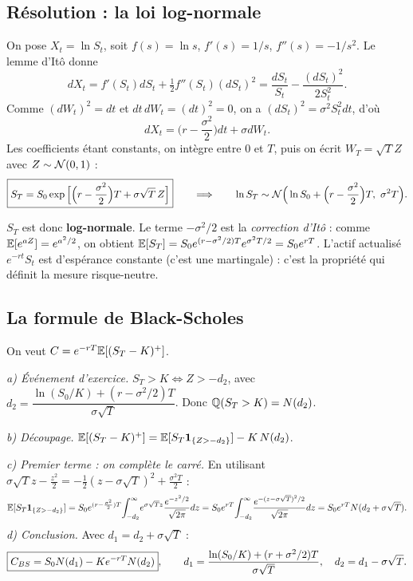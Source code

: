 \subsection{Résolution : la loi log-normale}
\begin{demo}
On pose $X_t = \ln S_t$, soit $f(s)=\ln s$, $f'(s) = 1/s$, $f''(s) = -1/s^2$. Le lemme d'Itô donne
\[
dX_t = f'(S_t)dS_t + \tfrac12f''(S_t)(dS_t)^2 = \frac{dS_t}{S_t} - \frac{(dS_t)^2}{2S_t^2}.
\]
Comme $(dW_t)^2 = dt$ et $dt\,dW_t = (dt)^2 = 0$, on a $(dS_t)^2 = \sigma^2S_t^2dt$, d'où
\[
dX_t = \Big(r-\frac{\sigma^2}{2}\Big)dt + \sigma dW_t.
\]
Les coefficients étant constants, on intègre entre $0$ et $T$, puis on écrit $W_T = \sqrt T Z$ avec $Z\sim\mathcal{N}(0,1)$ :
\[
\boxed{S_T = S_0\exp\Big[\Big(r-\frac{\sigma^2}2\Big)T + \sigma\sqrt T\,Z\Big]}
\qquad\Longrightarrow\qquad \ln S_T\sim\mathcal{N}\Big(\ln S_0+\Big(r-\frac{\sigma^2}2\Big)T,\ \sigma^2T\Big).
\]
\end{demo}

$S_T$ est donc \textbf{log-normale}. Le terme $-\sigma^2/2$ est la \emph{correction d'Itô} : comme $\mathbb{E}[e^{aZ}] = e^{a^2/2}$, on obtient
$\mathbb{E}[S_T] = S_0e^{(r-\sigma^2/2)T}e^{\sigma^2T/2} = S_0e^{rT}$. L'actif actualisé $e^{-rt}S_t$ est d'espérance constante (c'est une martingale) : c'est la propriété qui définit la mesure risque-neutre.

\subsection{La formule de Black-Scholes}
\begin{demo}
On veut $C = e^{-rT}\mathbb{E}[(S_T-K)^+]$.

\emph{a) Événement d'exercice.} $S_T>K \iff Z>-d_2$, avec $d_2 = \dfrac{\ln(S_0/K)+(r-\sigma^2/2)T}{\sigma\sqrt T}$. Donc $\mathbb{Q}(S_T>K) = N(d_2)$.

\emph{b) Découpage.} $\mathbb{E}[(S_T-K)^+] = \mathbb{E}[S_T\mathbf{1}_{\{Z>-d_2\}}] - K\,N(d_2)$.

\emph{c) Premier terme : on complète le carré.} En utilisant $\sigma\sqrt Tz - \frac{z^2}{2} = -\frac12(z-\sigma\sqrt T)^2 + \frac{\sigma^2T}{2}$ :
\[
\mathbb{E}[S_T\mathbf{1}_{\{Z>-d_2\}}] = S_0e^{(r-\frac{\sigma^2}{2})T}\!\int_{-d_2}^{\infty}\! e^{\sigma\sqrt Tz}\frac{e^{-z^2/2}}{\sqrt{2\pi}}dz
= S_0e^{rT}\!\int_{-d_2}^{\infty}\!\frac{e^{-(z-\sigma\sqrt T)^2/2}}{\sqrt{2\pi}}dz = S_0e^{rT}N(d_2+\sigma\sqrt T).
\]
\emph{d) Conclusion.} Avec $d_1 = d_2+\sigma\sqrt T$ :
\[
\boxed{C_{BS} = S_0N(d_1) - Ke^{-rT}N(d_2)},\qquad d_1 = \frac{\ln(S_0/K)+(r+\sigma^2/2)T}{\sigma\sqrt T},\quad d_2 = d_1-\sigma\sqrt T.
\]
\end{demo}

